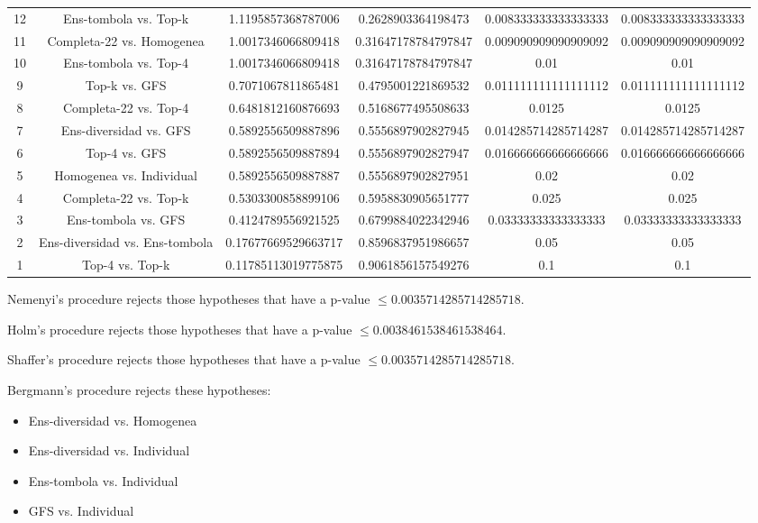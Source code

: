 \documentclass[a4paper,10pt]{article}
\begin{document}
\begin{landscape}
\begin{table}[!htp]
\begin{tabular}{cccccc}
12&Ens-tombola vs. Top-k&1.1195857368787006&0.2628903364198473&0.008333333333333333&0.008333333333333333\\
11&Completa-22 vs. Homogenea&1.0017346066809418&0.31647178784797847&0.009090909090909092&0.009090909090909092\\
10&Ens-tombola vs. Top-4&1.0017346066809418&0.31647178784797847&0.01&0.01\\
9&Top-k vs. GFS&0.7071067811865481&0.4795001221869532&0.011111111111111112&0.011111111111111112\\
8&Completa-22 vs. Top-4&0.6481812160876693&0.5168677495508633&0.0125&0.0125\\
7&Ens-diversidad vs. GFS&0.5892556509887896&0.5556897902827945&0.014285714285714287&0.014285714285714287\\
6&Top-4 vs. GFS&0.5892556509887894&0.5556897902827947&0.016666666666666666&0.016666666666666666\\
5&Homogenea vs. Individual&0.5892556509887887&0.5556897902827951&0.02&0.02\\
4&Completa-22 vs. Top-k&0.5303300858899106&0.5958830905651777&0.025&0.025\\
3&Ens-tombola vs. GFS&0.4124789556921525&0.6799884022342946&0.03333333333333333&0.03333333333333333\\
2&Ens-diversidad vs. Ens-tombola&0.17677669529663717&0.8596837951986657&0.05&0.05\\
1&Top-4 vs. Top-k&0.11785113019775875&0.9061856157549276&0.1&0.1\\
\hline
\end{tabular}
\end{table}
Nemenyi's procedure rejects those hypotheses that have a p-value $\le0.0035714285714285718$.


Holm's procedure rejects those hypotheses that have a p-value $\le0.0038461538461538464$.


Shaffer's procedure rejects those hypotheses that have a p-value $\le0.0035714285714285718$.


Bergmann's procedure rejects these hypotheses:


\begin{itemize}


\item Ens-diversidad vs. Homogenea
\item Ens-diversidad vs. Individual
\item Ens-tombola vs. Individual
\item GFS vs. Individual
\end{itemize}



\end{landscape}
\end{document}
